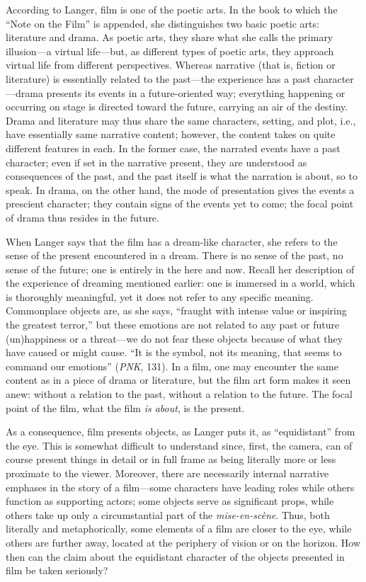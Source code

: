 \documentclass{tufte-handout}
\begin{document}
According to Langer, film is one of the poetic arts. In the book to
which the ``Note on the Film'' is appended, she distinguishes two basic
poetic arts: literature and drama. As poetic arts, they share what she
calls the primary illusion---a virtual life---but, as different types of
poetic arts, they approach virtual life from different perspectives.
Whereas narrative (that is, fiction or literature) is essentially
related to the past---the experience has a past character---drama
presents its events in a future-oriented way; everything happening or
occurring on stage is directed toward the future, carrying an air of the
destiny. Drama and literature may thus share the same characters,
setting, and plot, i.e., have essentially same narrative content;
however, the content takes on quite different features in each. In the
former case, the narrated events have a past character; even if set in
the narrative present, they are understood as consequences of the past,
and the past itself is what the narration is about, so to speak. In
drama, on the other hand, the mode of presentation gives the events a
prescient character; they contain signs of the events yet to come; the
focal point of drama thus resides in the future.

When Langer says that the film has a dream-like character, she refers to
the sense of the present encountered in a dream. There is no sense of
the past, no sense of the future; one is entirely in the here and now.
Recall her description of the experience of dreaming mentioned earlier:
one is immersed in a world, which is thoroughly meaningful, yet it does
not refer to any specific meaning. Commonplace objects are, as she says,
``fraught with intense value or inspiring the greatest terror,'' but
these emotions are not related to any past or future (un)happiness or a
threat---we do not fear these objects because of what they have caused
or might cause. ``It is the symbol, not its meaning, that seems to
command our emotions'' (\emph{PNK}, 131). In a film, one may encounter
the same content as in a piece of drama or literature, but the film art
form makes it seen anew: without a relation to the past, without a
relation to the future. The focal point of the film, what the film
\emph{is about}, is the present.

As a consequence, film presents objects, as Langer puts it, as
``equidistant'' from the eye. This is somewhat difficult to understand
since, first, the camera, can of course present things in detail or in
full frame as being literally more or less proximate to the viewer.
Moreover, there are necessarily internal narrative emphases in the story
of a film---some characters have leading roles while others function as
supporting actors; some objects serve as significant props, while others
take up only a circumstantial part of the \emph{mise-en-scène}. Thus,
both literally and metaphorically, some elements of a film are closer to
the eye, while others are further away, located at the periphery of
vision or on the horizon. How then can the claim about the equidistant
character of the objects presented in film be taken seriously?
\end{document}
